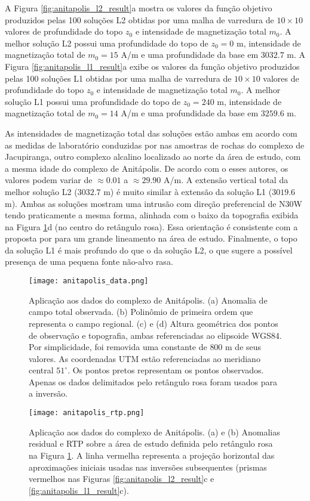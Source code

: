 A Figura \ref{fig:anitapolis_l2_result}a mostra os valores da função objetivo produzidos pelas 100 soluções L2 obtidas por uma malha de varredura de $10 \times 10$ valores de profundidade do topo $z_{0}$ e intensidade de magnetização total $m_{0}$.
A melhor solução L2 possui uma profundidade do topo de $z_{0} = 0$ m, intensidade de magnetização total de $m_{0} = 15$ A/m e uma profundidade da base em $3032.7$ m.
A Figura \ref{fig:anitapolis_l1_result}a exibe os valores da função objetivo produzidos pelas 100 soluções L1 obtidas por uma malha de varredura de $10 \times 10$ valores de profundidade do topo $z_{0}$ e intensidade de magnetização total $m_{0}$.
A melhor solução L1 possui uma profundidade do topo de $z_{0} = 240$ m, intensidade de magnetização total de $m_{0} = 14$ A/m e uma profundidade da base em $3259.6$ m.

As intensidades de magnetização total das soluções estão ambas em acordo com as medidas de laboratório conduzidas por \citet{valdivia_etal2009} nas amostras de rochas do complexo de Jacupiranga, outro complexo alcalino localizado ao norte da área de estudo, com a mesma idade do complexo de Anitápolis. De acordo com o esses autores,
os valores podem variar de $\approx 0.01$ a $\approx 29.90$ A/m.
A extensão vertical total da melhor solução L2 ($3032.7$ m) é muito similar à extensão da solução L1 ($3019.6$ m). 
Ambas as soluções mostram uma intrusão com direção preferencial de N30W tendo praticamente a mesma forma,
alinhada com o baixo da topografia exibida na Figura \ref{fig:anitapolis_data}d (no centro do retângulo rosa). 
Essa orientação é consistente com a proposta por \citet{horbach_marimon1980} para um grande lineamento na área de estudo.
Finalmente, o topo da solução L1 é mais profundo do que o da solução L2, 
o que sugere a possível presença de uma pequena fonte não-alvo rasa.

\pagebreak
\begin{figure}[!htb]
	\texttt{[image: anitapolis\_data.png]}
	\caption{Aplicação aos dados do complexo de Anitápolis. 
		(a) Anomalia de campo total observada.
		(b) Polinômio de primeira ordem que representa o campo regional.
		(c) e (d) Altura geométrica dos pontos de observação e topografia,
		ambas referenciadas ao elipsoide WGS84. Por simplicidade, foi removida uma constante de $800$ m de seus valores. As coordenadas UTM estão referenciadas ao meridiano central $51^{\circ}$. Os pontos pretos representam os pontos observados. Apenas os dados delimitados pelo retângulo rosa foram usados para a inversão. 
	}
	\label{fig:anitapolis_data}
\end{figure}
\pagebreak
\begin{figure}[!htb]
	\texttt{[image: anitapolis\_rtp.png]}
	\caption{Aplicação aos dados do complexo de Anitápolis. 
		(a) e (b) Anomalias residual e RTP sobre a área de estudo definida pelo retângulo rosa na Figura \ref{fig:anitapolis_data}.
		A linha vermelha representa a projeção horizontal das aproximações iniciais usadas nas inversões subsequentes (prismas vermelhos nas Figuras 
		\ref{fig:anitapolis_l2_result}c e \ref{fig:anitapolis_l1_result}c).
	}
	\label{fig:anitapolis_rtp_residual}
\end{figure}

